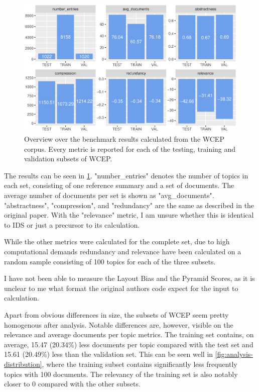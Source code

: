 \documentclass[../main.tex]{subfiles}
\begin{document}
\begin{figure}
    \includegraphics[width=\textwidth]{figures/analysis.eps}
    \caption{Overview over the benchmark results calculated from the WCEP corpus. Every metric is reported for each of the testing, training and validation subsets of WCEP.} \label{fig:analysis}
\end{figure}

The results can be seen in \ref{fig:analysis}. "number\_entries" denotes the number of topics in each set, consisting of one reference summary and a set of documents.
The average number of documents per set is shown as "avg\_documents". "abstractness", "compression", and "redundancy" are the same as described in the original paper.
With the "relevance" metric, I am unsure whether this is identical to IDS or just a precursor to its calculation.

While the other metrics were calculated for the complete set, due to high computational demands redundancy and relevance have been calculated on a random sample consisting of 100 topics for each of the three subsets.

I have not been able to measure the Layout Bias and the Pyramid Scores, as it is unclear to me what format the original authors code expect for the input to calculation.

Apart from obvious differences in size, the subsets of WCEP seem pretty homogenous after analysis.
Notable differences are, however, visible on the relevance and average documents per topic metrics.
The training set contains, on average, 15.47 (20.34\%) less documents per topic compared with the test set and 15.61 (20.49\%) less than the validation set.
This can be seen well in \ref{fig:analysis-distribution}, where the training subset contains significantly less frequently topics with 100 documents.
The relevancy of the training set is also notably closer to 0 compared with the other subsets.
\end{document}
